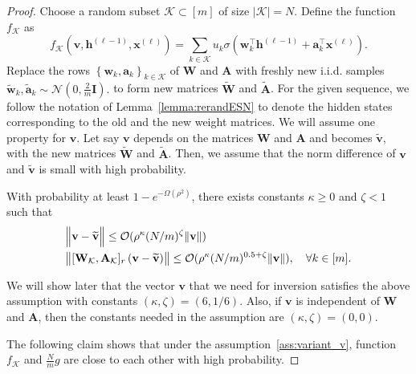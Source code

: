 \begin{proof}
	Choose a random subset $\mathcal{K} \subset[m]$ of size $|\mathcal{K}|=N$. Define the function $f_{\mathcal{K}}$ as
	\begin{equation*}
		f_{\mathcal{K}}(\mathbf{v}, \mathbf{h}^{(\ell-1)}, \mathbf{x}^{(\ell)}) = \sum_{k \in \mathcal{K}} u_{k} \sigma(\mathbf{w}_k^{\top} \mathbf{h}^{(\ell-1)} + \mathbf{a}_k^{\top} \mathbf{x}^{(\ell)}).  
	\end{equation*}
	Replace the rows $\left\{\mathbf{w}_{k}, \mathbf{a}_{k}\right\}_{k \in \mathcal{K}}$ of $\mathbf{W}$ and $\mathbf{A}$ with freshly new i.i.d. samples $\widetilde{\mathbf{w}}_{k}, \widetilde{\mathbf{a}}_{k} \sim \mathcal{N}\left(0, \frac{2}{m} \mathbf{I}\right).$ to form new matrices $\widetilde{\mathbf{W}}$ and $\widetilde{\mathbf{A}}$. For the given sequence, we follow the notation of Lemma~\ref{lemma:rerandESN} to denote the hidden states corresponding to the old and the new weight matrices. We will assume one property for $\mathbf{v}$. Let say $\mathbf{v}$ depends on the matrices $\mathbf{W}$ and $\mathbf{A}$ and becomes $\widetilde{\mathbf{v}}$, with the new matrices $\widetilde{\mathbf{W}}$ and $\widetilde{\mathbf{A}}$. Then, we assume that the norm difference of $\mathbf{v}$ and $\widetilde{\mathbf{v}}$ is small with high probability.
	\begin{assumption}\label{ass:variant_v}
		With probability at least $1-e^{-\Omega(\rho^2)}$,  there exists constants $\kappa \ge 0$ and $\zeta < 1$ such that
		\begin{align*}
			&\norm[2]{\mathbf{v} - \widetilde{\mathbf{v}}} \le \mathcal{O}(\rho^{\kappa} (N/m)^{\zeta} \norm{\mathbf{v}}) \\&
			\norm{[\mathbf{W}_{\mathcal{K}}, \mathbf{A}_{\mathcal{K}}]_r \left(\mathbf{v} - \widetilde{\mathbf{v}}\right)} \le \mathcal{O}(\rho^{\kappa} (N/m)^{0.5 + \zeta} \norm{\mathbf{v}}), \quad \forall k \in [m].
		\end{align*}
	\end{assumption}
	We will show later that the vector $\mathbf{v}$ that we need for inversion satisfies the above assumption with constants $(\kappa, \zeta) = (6, 1/6)$. Also, if $\mathbf{v}$ is independent of  $\mathbf{W}$ and $\mathbf{A}$, then the constants needed in the assumption are $(\kappa, \zeta) = (0, 0)$.
	
	
	The following claim shows that under the assumption~\ref{ass:variant_v}, function $f_{\mathcal{K}}$ and $\frac{N}{m}g$ are close to each other with high probability.
	

\end{proof}
